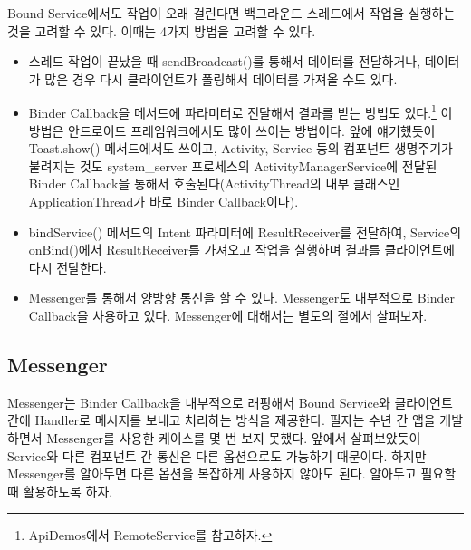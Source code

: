 Bound Service에서도 작업이 오래 걸린다면 백그라운드 스레드에서 작업을 실행하는 것을 고려할 수 있다. 이때는 4가지 방법을 고려할 수 있다.
\begin{itemize}
\item 스레드 작업이 끝났을 때 sendBroadcast()를 통해서 데이터를 전달하거나, 데이터가 많은 경우 다시 클라이언트가 폴링해서 데이터를 가져올 수도 있다.

\item Binder Callback을 메서드에 파라미터로 전달해서 결과를 받는 방법도 있다.\footnote{ApiDemos에서 RemoteService를 참고하자.} 
이 방법은 안드로이드 프레임워크에서도 많이 쓰이는 방법이다. 앞에 얘기했듯이 Toast.show() 메서드에서도 쓰이고, Activity, Service 등의 컴포넌트 생명주기가 불려지는 것도 system\_server 프로세스의 ActivityManagerService에 전달된 Binder Callback을 통해서 호출된다(ActivityThread의 내부 클래스인 ApplicationThread가 바로 Binder Callback이다).

\item bindService() 메서드의 Intent 파라미터에 ResultReceiver를 전달하여, Service의 onBind()에서 ResultReceiver를 가져오고 작업을 실행하며 결과를 클라이언트에 다시 전달한다.

\item Messenger를 통해서 양방향 통신을 할 수 있다. Messenger도 내부적으로 Binder Callback을 사용하고 있다. Messenger에 대해서는 별도의 절에서 살펴보자.
\end{itemize}

\subsection{Messenger}
\label{subsec:messenger}
Messenger는 Binder Callback을 내부적으로 래핑해서 Bound Service와 클라이언트 간에 Handler로 메시지를 보내고 처리하는 방식을 제공한다.
필자는 수년 간 앱을 개발하면서 Messenger를 사용한 케이스를 몇 번 보지 못했다. 
앞에서 살펴보았듯이 Service와 다른 컴포넌트 간 통신은 다른 옵션으로도 가능하기 때문이다. 
하지만 Messenger를 알아두면 다른 옵션을 복잡하게 사용하지 않아도 된다. 알아두고 필요할 때 활용하도록 하자.\\

